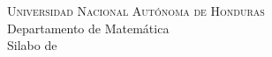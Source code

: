 \documentclass[letterpaper]{article}
\begin{document}
\begin{center}
  \Large \textsc{Universidad Nacional Autónoma de Honduras}\\
  \large Departamento de Matemática\\
  Silabo de %
\end{center}

\end{document}
